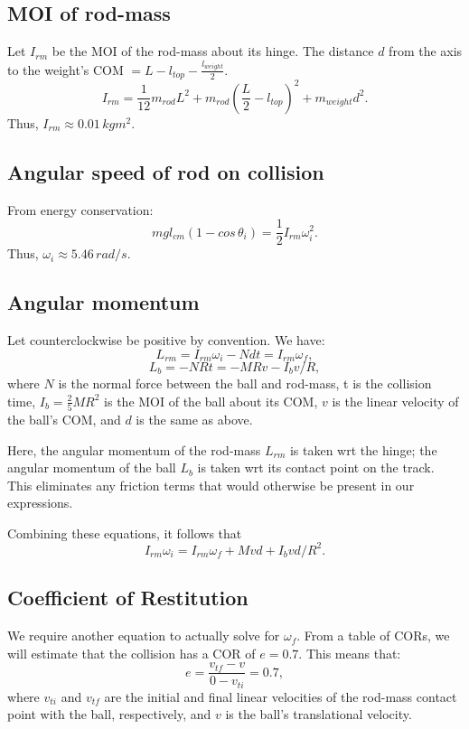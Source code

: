 \documentclass[12pt]{article} %
\begin{document}
\subsection{MOI of rod-mass}

Let $I_{rm}$ be the MOI of the rod-mass about its hinge. The distance $d$ from the axis to the weight's COM $= L - l_{top} - \frac{l_{weight}}{2}$.
$$I_{rm} = \frac{1}{12}m_{rod}L^2 + m_{rod}(\frac{L}{2} - l_{top})^2 + m_{weight}d^2.$$
Thus, $I_{rm} \approx 0.01\, kgm^2$.

\subsection{Angular speed of rod on collision}

From energy conservation:
$$mgl_{cm}(1-cos\,\theta_i) = \frac{1}{2}I_{rm}\omega_i^2.$$
Thus, $\omega_i \approx 5.46\, rad/s$.

\subsection{Angular momentum}

Let counterclockwise be positive by convention. We have:
$$L_{rm} = I_{rm}\omega_i - Ndt = I_{rm}\omega_f,$$
$$L_b = -NRt = -MRv - I_b v/R,$$
where $N$ is the normal force between the ball and rod-mass, t is the collision time, $I_b = \frac{2}{5}MR^2$ is the MOI of the ball about its COM, $v$ is the linear velocity of the ball's COM, and $d$ is the same as above.

Here, the angular momentum of the rod-mass $L_{rm}$ is taken wrt the hinge; the angular momentum of the ball $L_b$ is taken wrt its contact point on the track. This eliminates any friction terms that would otherwise be present in our expressions.

Combining these equations, it follows that
$$I_{rm} \omega_i = I_{rm} \omega_f + Mvd + I_b vd/R^2.$$

\subsection{Coefficient of Restitution}

We require another equation to actually solve for $\omega_f$. From a table of CORs, we will estimate that the collision has a COR of $e = 0.7$.
This means that: $$e = \frac{v_{tf} - v}{0-v_{ti}} = 0.7,$$
where $v_{ti}$ and $v_{tf}$ are the initial and final linear velocities of the rod-mass contact point with the ball, respectively, and $v$ is the ball's translational velocity.
\end{document}
